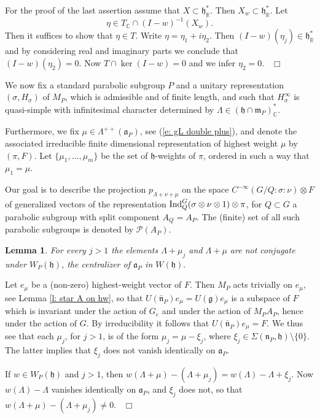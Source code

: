 \documentclass[12pt,a4paper]{article}
\newtheorem{Lemma}[Thm]{Lemma}
\newenvironment{lemma}[0]{\begin{Lemma}\noindent}%
{\end{Lemma}}
\def\proof{\par\noindent{\it Proof.}{\ }{\ }}
\def\qed{~\hfill\hbox{$\Box$}\medbreak}
\def\msy#1{{\mathbb #1}}
\def\C{{\msy C}}
\def\R{{\msy R}}
\def\gs{\sigma}
\def\gS{\Sigma}
\def\got#1{\mathfrak #1}
\def\fa{{\got a}}
\def\fg{{\got g}}
\def\fh{{\got h}}
\def\fm{{\got m}}
\def\fn{{\got n}}
\def\iC{{\scriptscriptstyle \C}}
\def\iR{{\scriptscriptstyle \R}}
\def\cP{{\mathcal P}}
\numberwithin{Thm}{section}
\numberwithin{equation}{section}
\def\Ind{{\rm Ind}}
\def\gL{\Lambda}
\numberwithin{equation}{section}
\def\gL{\Lambda}
\def\fh{{\mathfrak h}}
\def\faP{\fa_P}
\begin{document}
For the proof of the last assertion assume that $X\subset \fh^*_\R$. Then $X_w\subset \fh_\R^*.$ 
Let 
$$ 
\eta \in T_\iC \cap (I - w)^{-1}(X_w).
$$  
Then it suffices to show that $\eta \in T.$ Write $\eta = \eta_1 + i \eta_2.$ 
Then $(I-w)(\eta_j) \in \fh^*_\iR$ and  by considering real and imaginary parts
we conclude that $(I - w)(\eta_2) = 0.$ Now $T \cap \ker (I -w) = 0$ and we infer $\eta_2 = 0.$ 
 \qed


We now fix a standard parabolic subgroup $P$ and a unitary representation $(\gs, H_\gs)$ of $M_P$, 
which is admissible and of finite length, and such that $H_\gs^\infty$ is quasi-simple with infinitesimal 
character determined by $\gL \in (\fh \cap \fm_P)^*_\iC.$
 
Furthermore, we fix $\mu \in \gL^{++}(\fa_P)$, see
(\ref{e: gL double plus}),
and denote the associated irreducible finite dimensional representation of highest weight $\mu$ by 
$(\pi, F).$ Let $\{\mu_1,\ldots, \mu_m\}$ be the set of $\fh$-weights of $\pi$, 
ordered in such a way that $\mu_1 = \mu.$ 

Our goal is to describe the projection $p_{\gL + \nu + \mu}$ on the space
$C^{-\infty}(G/Q:\gs:\nu ) \otimes F$ of generalized vectors of the representation
$\Ind_Q^G(\gs \otimes \nu \otimes 1) \otimes \pi$, for $Q \subset G$ a parabolic subgroup with 
split component $A_Q = A_P.$ 
The (finite) set of all such parabolic subgroups is denoted by 
$\cP(A_P).$ 

\begin{lemma}
\label{l: second weyl conjugacy}
For every $j > 1$ the elements $\gL + \mu_j $ and $\gL + \mu$ are not conjugate under $W_P(\fh)$, 
the centralizer of $\fa_P$ in $W(\fh).$ 
\end{lemma}

\proof
Let $e_\mu$ be a (non-zero) highest-weight vector of $F.$ Then $M_P$ acts trivially on $e_\mu,$
see Lemma \ref{l: star A on hw},
so that $U(\bar\fn_P) e_\mu  = U(\fg) e_\mu $ is a subspace of $F$ which is invariant under
the action of $G_e$ and under the action of $M_P A_P$, hence under the action of 
$G.$ By irreducibility it follows that $U(\bar\fn_P) e_\mu = F.$ We thus see that each $\mu_j$, 
for $j > 1$, is of the form $\mu_j = \mu - \xi_j$, where $\xi_j \in \gS(\fn_P, \fh)\setminus \{0\}.$ 
The latter implies that $\xi_j$ does not vanish identically on $\fa_P.$ 

If $w \in W_P(\fh)$ and $j >1$, then $w(\gL + \mu) - (\gL + \mu_j) = w(\gL) - \gL + \xi_j.$ 
Now $w(\gL ) - \gL$ vanishes identically on $\faP$, and $\xi_j$ does not, so that 
$w(\gL + \mu) - (\gL + \mu_j) \neq 0.$ 
\qed 
\end{document}
